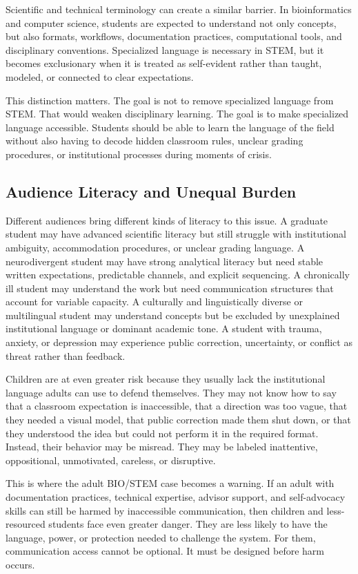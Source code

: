 Scientific and technical terminology can create a similar barrier. In bioinformatics and computer science, students are expected to understand not only concepts, but also formats, workflows, documentation practices, computational tools, and disciplinary conventions. Specialized language is necessary in STEM, but it becomes exclusionary when it is treated as self-evident rather than taught, modeled, or connected to clear expectations.

This distinction matters. The goal is not to remove specialized language from STEM. That would weaken disciplinary learning. The goal is to make specialized language accessible. Students should be able to learn the language of the field without also having to decode hidden classroom rules, unclear grading procedures, or institutional processes during moments of crisis.

\subsection*{Audience Literacy and Unequal Burden}

Different audiences bring different kinds of literacy to this issue. A graduate student may have advanced scientific literacy but still struggle with institutional ambiguity, accommodation procedures, or unclear grading language. A neurodivergent student may have strong analytical literacy but need stable written expectations, predictable channels, and explicit sequencing. A chronically ill student may understand the work but need communication structures that account for variable capacity. A culturally and linguistically diverse or multilingual student may understand concepts but be excluded by unexplained institutional language or dominant academic tone. A student with trauma, anxiety, or depression may experience public correction, uncertainty, or conflict as threat rather than feedback.

Children are at even greater risk because they usually lack the institutional language adults can use to defend themselves. They may not know how to say that a classroom expectation is inaccessible, that a direction was too vague, that they needed a visual model, that public correction made them shut down, or that they understood the idea but could not perform it in the required format. Instead, their behavior may be misread. They may be labeled inattentive, oppositional, unmotivated, careless, or disruptive.

This is where the adult BIO/STEM case becomes a warning. If an adult with documentation practices, technical expertise, advisor support, and self-advocacy skills can still be harmed by inaccessible communication, then children and less-resourced students face even greater danger. They are less likely to have the language, power, or protection needed to challenge the system. For them, communication access cannot be optional. It must be designed before harm occurs.

